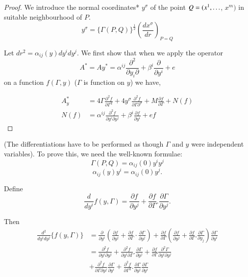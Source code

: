 \begin{proof}
 We introduce the normal coordinates* $y^\sigma$ of the point
 $Q=(x^1,\break \ldots$, $x^m)$ in suitable neighbourhood of $P$. 
 $$
 y^\sigma= \{ \Gamma (P,Q)\}^{\frac{1}{2}} \left(\frac
 {dx^\sigma}{dr}\right)_{P=Q} 
 $$

 Let $dr^2=\alpha_{ij}(y)dy^i dy^j$. We first show that when we apply
 the operator 
 $$
 A^*=Ay^*= \alpha^{ij} \frac{\partial^2}{\partial y_i \partial}+
 \beta^i \frac{\partial}{\partial y^i}+e 
 $$
 on a function $f(\Gamma,y)$ ($\Gamma$ is function on $y$) we have,

 \begin{align*}
  A^*_y&= 4 \Gamma \frac{\partial^2 f}{\partial \Gamma^2} +4
  y^\sigma \frac{\partial^2 f}{\partial \Gamma \partial^\sigma}+M
  \frac {\partial f}{\partial \Gamma} +N(f)\\ 
  N(f)&= \alpha^{ij} \frac{\partial^2 f}{\partial y^i \partial y^j}+
  \beta^i \frac{\partial f}{\partial y^i}+ef 
 \end{align*}
\end{proof}

 (The differentiations have to be performed as though $\Gamma$ and
 $y$ were independent variables). To prove this, we need the
 well-known formulae: 
\begin{equation}
 \Gamma (P,Q)= \alpha_{ij}(0)y^i y^j\tag{1}
\end{equation}
$$
\alpha_{ij} (y) y^i =\alpha_{ij} (0) y^j.
$$

Define\pageoriginale
$$
\frac{d}{dy^i}f(y,\Gamma)= \frac{\partial f}{\partial y^j}+
\frac{\partial f}{\partial \Gamma}. \frac{\partial \Gamma}{\partial
 y^j}. 
$$

Then
\begin{align*}
 \frac{d^2}{dy^i dy^j}\{f (y, \Gamma) \} &= \frac{\partial}{\partial
  y^i} \left(\frac{\partial f}{\partial y^j}+ \frac{\partial f}{\partial
  \Gamma}\cdot \frac{\partial \Gamma}{\partial y^j}\right) +
 \frac{\partial f}{\partial \Gamma} \left(\frac{\partial
  f}{\partial y^j}+ \frac{\partial f}{\partial
  \Gamma}. \frac{\partial \Gamma}{\partial y_j}\right)\frac{\partial
  \Gamma}{\partial y^i}\\ 
 &=\frac{\partial^2 f}{\partial y^i\partial y^j}+\frac{\partial^2
  f}{\partial y^i \partial \Gamma}. \frac{\partial \Gamma}{\partial
  y^j}+\frac{\partial f}{\partial \Gamma} \frac{\partial^2
  \Gamma}{\partial y^i \partial y^j}\\ 
 &+ \frac{\partial^2 f}{\partial \Gamma \partial y^j} \frac{\partial
  \Gamma}{\partial y^i}+ \frac{\partial^2f}{\partial \Gamma
 ^2}.\frac{\partial \Gamma}{\partial y^j} \frac{\partial
  \Gamma}{\partial y^i} 
\end{align*}

